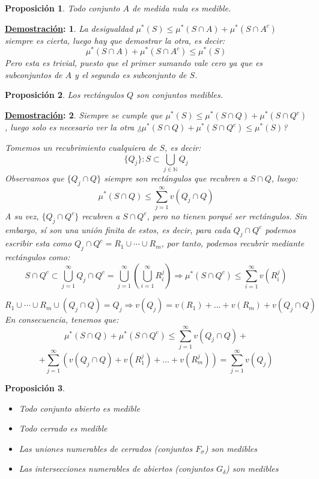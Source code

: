 \documentclass[10pt,a4paper,openright]{book}
\theoremstyle{break}
\newtheorem*{prop}{Proposición}
\newtheorem*{demo}{\underline{Demostración}:}
\begin{document}
\begin{prop}
Todo conjunto $A$ de medida nula es medible.
\end{prop}
\begin{demo}
La desigualdad $\mu^*\left( S \right) \le \mu^*\left( S\cap A \right) + \mu^*\left( S\cap A^c \right)$ siempre es cierta, luego hay que demostrar la otra, es decir:
$$ \mu^*\left( S\cap A \right) + \mu^*\left( S\cap A^c \right) \le \mu^*\left( S \right) $$
Pero esta es trivial, puesto que el primer sumando vale cero ya que es subconjuntos de $A$ y el segundo es subconjunto de $S$.
\end{demo}

\begin{prop}
Los rectángulos $Q$ son conjuntos medibles. 
\end{prop}
\begin{demo}
Siempre se cumple que $ \mu^*\left( S \right) \le \mu^*\left( S\cap Q \right) + \mu^*\left( S\cap Q^c \right)$, luego solo es necesario ver la otra ¿$ \mu^*\left( S\cap Q \right) + \mu^*\left( S\cap Q^c \right) \le \mu^*\left( S \right)$?

Tomemos un recubrimiento cualquiera de $S$, es decir:
$$\{Q_j\}: S \subset \bigcup_{j \in \mathbb{N}} Q_j$$
Observamos que $ \{Q_j \cap Q\} $ siempre son rectángulos que recubren a $S\cap Q$, luego:
$$\mu^*\left( S\cap Q \right) \le \sum_{j=1}^{\infty} v\left( Q_j \cap Q \right)$$
A su vez, $ \{Q_j \cap Q^c\}$ recubren a $S\cap Q^c$, pero no tienen porqué ser rectángulos. Sin embargo, sí son una unión finita de estos, es decir, para cada $Q_j \cap Q^c$ podemos escribir esta como $Q_j \cap Q^c = R_1 \cup \cdots \cup R_m$, por tanto, podemos recubrir mediante rectángulos como:
$$S \cap Q^c \subset \bigcup_{j=1}^\infty Q_j\cap Q^c = \bigcup_{j=1}^\infty \left(\bigcup_{i=1}^\infty  R_i^j \right)\Rightarrow \mu^*\left( S\cap Q^c \right) \le \sum_{i=1}^{\infty} v\left( R^j_i \right) $$

$$ R_1 \cup \cdots \cup R_m \cup \left( Q_j \cap Q \right) = Q_j \Rightarrow v\left( Q_j \right) = v\left( R_1 \right) +\ldots + v\left( R_m \right) + v\left( Q_j\cap Q \right) $$
En consecuencia, tenemos que:
$$\mu^*\left( S\cap Q \right) + \mu^*\left( S \cap Q^c \right) \le \sum_{j=1}^{\infty} v\left( Q_j \cap Q \right) + $$
$$+ \sum_{j=1}^{\infty} \left( v\left( Q_j\cap Q \right) + v\left( R_1^j \right) +\ldots + v\left( R_m^j \right) \right) = \sum_{j=1}^{\infty} v\left( Q_j \right)$$
\end{demo}

\begin{prop}
\begin{itemize}
\item Todo conjunto abierto es medible
\item Todo cerrado es medible
\item Las uniones numerables de cerrados (conjuntos $F_\sigma$) son medibles
\item Las intersecciones numerables de abiertos  (conjuntos $G_\delta$) son medibles
\end{itemize}
\end{prop}
\end{document}
